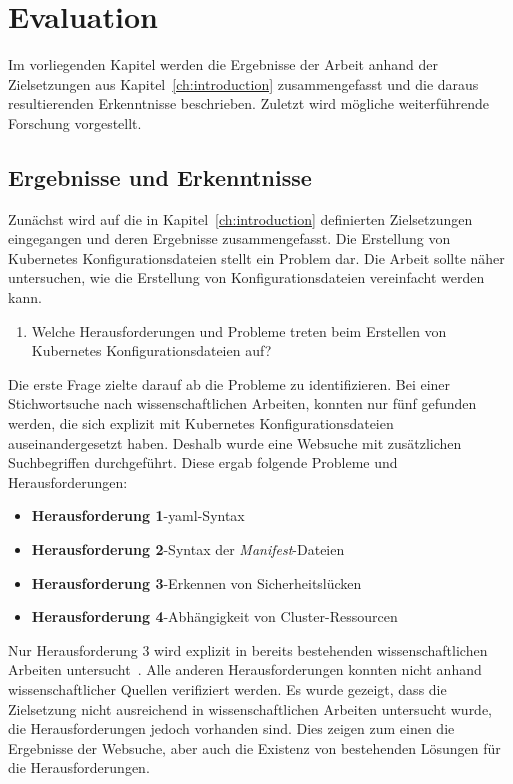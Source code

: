 \chapter{Evaluation}\label{ch:evaluation}

Im vorliegenden Kapitel werden die Ergebnisse der Arbeit anhand der Zielsetzungen aus Kapitel~\ref{ch:introduction} zusammengefasst
und die daraus resultierenden Erkenntnisse beschrieben. Zuletzt wird mögliche weiterführende Forschung vorgestellt.

\section{Ergebnisse und Erkenntnisse}

Zunächst wird auf die in Kapitel~\ref{ch:introduction} definierten Zielsetzungen eingegangen und deren Ergebnisse zusammengefasst.
Die Erstellung von Kubernetes Konfigurationsdateien stellt ein Problem dar.
Die Arbeit sollte näher untersuchen, wie die Erstellung von Konfigurationsdateien vereinfacht werden kann.

\begin{enumerate}
    \item Welche Herausforderungen und Probleme treten beim Erstellen von Kubernetes Konfigurationsdateien auf?
\end{enumerate}
Die erste Frage zielte darauf ab die Probleme zu identifizieren. Bei einer Stichwortsuche nach wissenschaftlichen Arbeiten, konnten nur
fünf gefunden werden, die sich explizit mit Kubernetes Konfigurationsdateien
auseinandergesetzt haben.
Deshalb wurde eine Websuche mit zusätzlichen Suchbegriffen durchgeführt.
Diese ergab folgende Probleme und Herausforderungen:

\begin{itemize}
    \setlength\itemsep{-0.5cm}
    \item \textbf{Herausforderung 1}-\ac{yaml}-Syntax
    \item \textbf{Herausforderung 2}-Syntax der \textit{Manifest}-Dateien
    \item \textbf{Herausforderung 3}-Erkennen von Sicherheitslücken
    \item \textbf{Herausforderung 4}-Abhängigkeit von Cluster-Ressourcen
\end{itemize}
Nur Herausforderung 3 wird explizit in bereits bestehenden wissenschaftlichen Arbeiten untersucht~\cite{9476056,10.1145/3579639,10.1145/3468264.3473495}.
Alle anderen Herausforderungen konnten nicht anhand wissenschaftlicher Quellen verifiziert werden.
Es wurde gezeigt, dass die Zielsetzung nicht ausreichend in wissenschaftlichen Arbeiten untersucht wurde, die Herausforderungen jedoch vorhanden sind.
Dies zeigen zum einen die Ergebnisse der Websuche, aber auch die Existenz von bestehenden Lösungen für die Herausforderungen.

